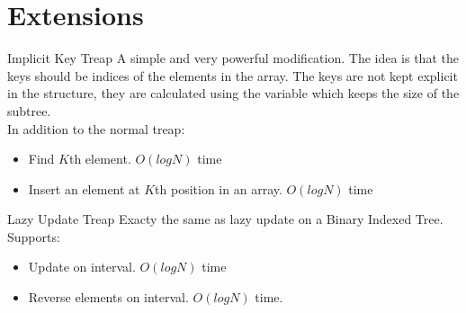 \documentclass[10pt]{beamer}
\begin{document}
\section{Extensions}


\begin{frame}
\begin{block}{Implicit Key Treap}
A simple and very powerful modification. The idea is that the keys should be indices of the elements in the array. The keys are not kept explicit in the structure, they are calculated using the variable which keeps the size of the subtree.\\
In addition to the normal treap: 
		\begin{itemize}
			\item Find $K$th element. $O(logN)$ time
			\item Insert an element at $K$th position in an array. $O(logN)$ time
		\end{itemize}
\end{block}
\begin{block}{Lazy Update Treap}
	Exacty the same as lazy update on a Binary Indexed Tree.
	Supports:
		\begin{itemize}
			\item Update on interval. $O(logN)$ time
			\item Reverse elements on interval. $O(logN)$ time.
		\end{itemize}
\end{block}
\end{frame}
\end{document}
